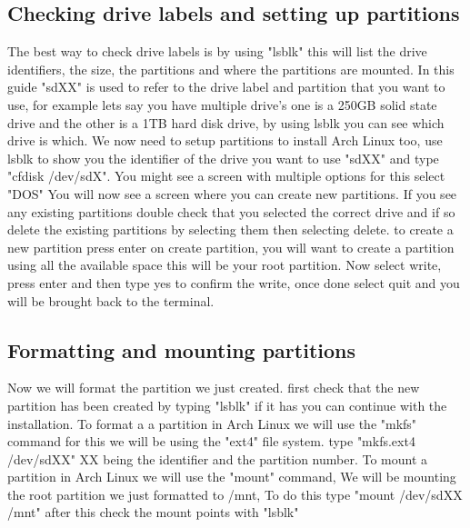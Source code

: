\documentclass[titlepage]{article}
\begin{document}
   \subsection{Checking drive labels and setting up partitions}
   The best way to check drive labels is by using "lsblk" this will list the drive identifiers, the size, the partitions and where the partitions are mounted. In this guide "sdXX" is used to refer to the drive label and partition that you want to use, for example lets say you have multiple drive's one is a 250GB solid state drive and the other is a 1TB hard disk drive, by using lsblk you can see which drive is which. We now need to setup partitions to install Arch Linux too, use lsblk to show you the identifier of the drive you want to use "sdXX" and type "cfdisk /dev/sdX". You might see a screen with multiple options for this select "DOS" You will now see a screen where you can create new partitions. If you see any existing partitions double check that you selected the correct drive and if so delete the existing partitions by selecting them then selecting delete. to create a new partition press enter on create partition, you will want to create a partition using all the available space this will be your root partition. Now select write, press enter and then type yes to confirm the write, once done select quit and you will be brought back to the terminal.
   \vspace*{0.5 cm}
   \subsection{Formatting and mounting partitions}
   Now we will format the partition we just created. first check that the new partition has been created by typing "lsblk" if it has you can continue with the installation. To format a a partition in Arch Linux we will use the "mkfs" command for this we will be using the "ext4" file system. type "mkfs.ext4 /dev/sdXX" XX being the identifier and the partition number. To mount a partition in Arch Linux we will use the "mount" command, We will be mounting the root partition we just formatted to /mnt, To do this type "mount /dev/sdXX /mnt" after this check the mount points with "lsblk"
   \vspace*{0.5 cm}
\end{document}
